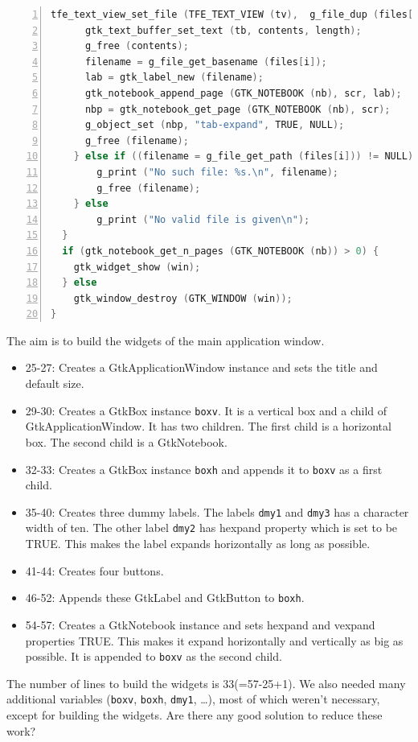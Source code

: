 \begin{lstlisting}[language=C, numbers=left]
      tfe_text_view_set_file (TFE_TEXT_VIEW (tv),  g_file_dup (files[i]));
      gtk_text_buffer_set_text (tb, contents, length);
      g_free (contents);
      filename = g_file_get_basename (files[i]);
      lab = gtk_label_new (filename);
      gtk_notebook_append_page (GTK_NOTEBOOK (nb), scr, lab);
      nbp = gtk_notebook_get_page (GTK_NOTEBOOK (nb), scr);
      g_object_set (nbp, "tab-expand", TRUE, NULL);
      g_free (filename);
    } else if ((filename = g_file_get_path (files[i])) != NULL) {
        g_print ("No such file: %s.\n", filename);
        g_free (filename);
    } else
        g_print ("No valid file is given\n");
  }
  if (gtk_notebook_get_n_pages (GTK_NOTEBOOK (nb)) > 0) {
    gtk_widget_show (win);
  } else
    gtk_window_destroy (GTK_WINDOW (win));
}
\end{lstlisting}

The aim is to build the widgets of the main application window.

\begin{itemize}
\tightlist
\item
  25-27: Creates a GtkApplicationWindow instance and sets the title and
  default size.
\item
  29-30: Creates a GtkBox instance \passthrough{\lstinline!boxv!}. It is
  a vertical box and a child of GtkApplicationWindow. It has two
  children. The first child is a horizontal box. The second child is a
  GtkNotebook.
\item
  32-33: Creates a GtkBox instance \passthrough{\lstinline!boxh!} and
  appends it to \passthrough{\lstinline!boxv!} as a first child.
\item
  35-40: Creates three dummy labels. The labels
  \passthrough{\lstinline!dmy1!} and \passthrough{\lstinline!dmy3!} has
  a character width of ten. The other label
  \passthrough{\lstinline!dmy2!} has hexpand property which is set to be
  TRUE. This makes the label expands horizontally as long as possible.
\item
  41-44: Creates four buttons.
\item
  46-52: Appends these GtkLabel and GtkButton to
  \passthrough{\lstinline!boxh!}.
\item
  54-57: Creates a GtkNotebook instance and sets hexpand and vexpand
  properties TRUE. This makes it expand horizontally and vertically as
  big as possible. It is appended to \passthrough{\lstinline!boxv!} as
  the second child.
\end{itemize}

The number of lines to build the widgets is 33(=57-25+1). We also needed
many additional variables (\passthrough{\lstinline!boxv!},
\passthrough{\lstinline!boxh!}, \passthrough{\lstinline!dmy1!}, \ldots),
most of which weren't necessary, except for building the widgets. Are
there any good solution to reduce these work?

